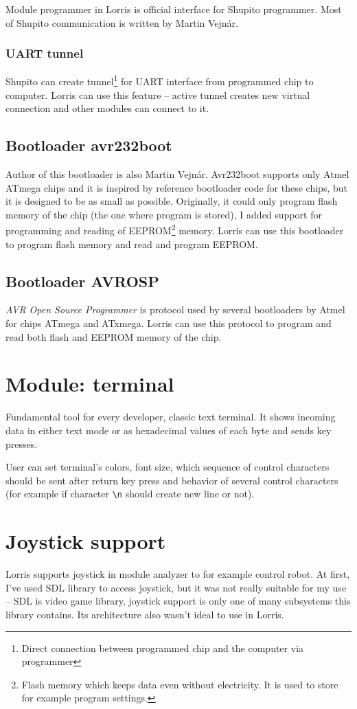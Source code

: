 \documentclass[12pt, a4paper, oneside]{article}
\newcommand{\It}{\textit}  %
\begin{document}
Module programmer in Lorris is official interface for Shupito programmer. Most of Shupito communication is written by Martin Vejnár.

\subsubsection{UART tunnel}
\label{tunel}
Shupito can create tunnel\footnote{Direct connection between programmed chip and the computer via programmer} for UART interface from programmed chip to computer. Lorris can use this feature -- active tunnel creates new virtual connection and other modules can connect to it.

\subsection{Bootloader avr232boot}
Author of this bootloader is also Martin Vejnár. Avr232boot supports only Atmel ATmega chips and it is inspired by reference bootloader code for these chips, but it is designed to be as small as possible. Originally, it could only program flash memory of the chip (the one where program is stored), I added support for programming and reading of EEPROM\footnote{Flash memory which keeps data even without electricity. It is used to store for example program settings.} memory. Lorris can use this bootloader to program flash memory and read and program EEPROM.

\subsection{Bootloader AVROSP}
\It{AVR Open Source Programmer} is protocol used by several bootloaders by Atmel for chips ATmega and ATxmega. Lorris can use this protocol to program and read both flash and EEPROM memory of the chip.

\section{Module: terminal}
Fundamental tool for every developer, classic text terminal. It shows incoming data in either text mode or as hexadecimal values of each byte and sends key presses.

User can set terminal's colors, font size, which sequence of control characters should be sent after return key press and behavior of several control characters (for example if character \verb|\n| should create new line or not).

\section{Joystick support}
Lorris supports joystick in module analyzer to for example control robot. At first, I've used SDL library to access joystick, but it was not really suitable for my use -- SDL is video game library, joystick support is only one of many subsystems this library contains. Its architecture also wasn't ideal to use in Lorris.
\end{document}
